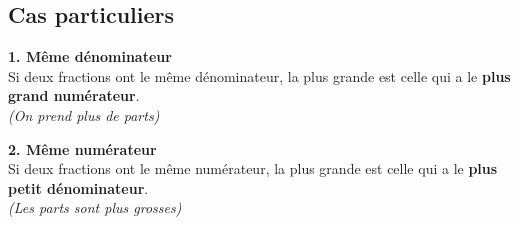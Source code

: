 \documentclass[a4paper]{book}
\begin{document}
\subsection{Cas particuliers}
    
    \begin{propriete}
        \begin{minipage}[t]{0.48\textwidth}
            \textbf{1. Même dénominateur} \\
            Si deux fractions ont le même dénominateur, la plus grande est celle qui a le \textbf{plus grand numérateur}. \\
            \textit{(On prend plus de parts)}
        \end{minipage}
        \hfill
        \begin{minipage}[t]{0.48\textwidth}
            \textbf{2. Même numérateur} \\
            Si deux fractions ont le même numérateur, la plus grande est celle qui a le \textbf{plus petit dénominateur}. \\
            \textit{(Les parts sont plus grosses)}
        \end{minipage}
    \end{propriete}
    
\end{document}

